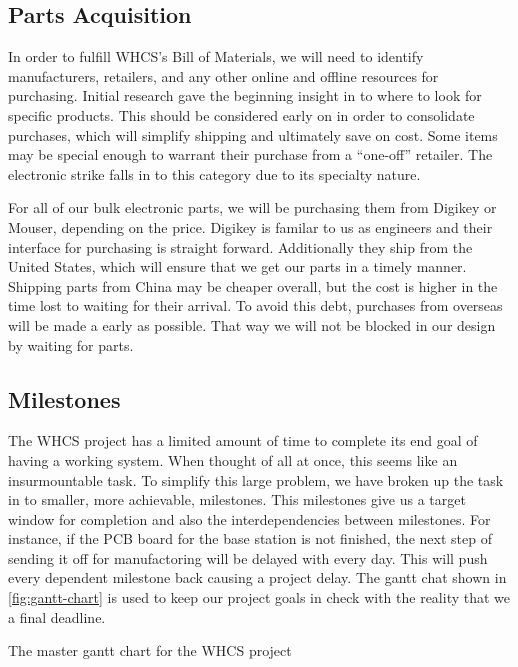 \subsection{Parts Acquisition}
In order to fulfill WHCS's Bill of Materials, we will need to identify
manufacturers, retailers, and any other online and offline resources for
purchasing. Initial research gave the beginning insight in to where to look for
specific products. This should be considered early on in order to consolidate
purchases, which will simplify shipping and ultimately save on cost. Some items
may be special enough to warrant their purchase from a ``one-off'' retailer.
The electronic strike falls in to this category due to its specialty nature.

For all of our bulk electronic parts, we will be purchasing them from Digikey
or Mouser, depending on the price. Digikey is familar to us as engineers and
their interface for purchasing is straight forward. Additionally they ship from
the United States, which will ensure that we get our parts in a timely manner.
Shipping parts from China may be cheaper overall, but the cost is higher in the
time lost to waiting for their arrival. To avoid this debt, purchases from
overseas will be made a early as possible. That way we will not be blocked in
our design by waiting for parts.

\subsection{Milestones}
The WHCS project has a limited amount of time to complete its end goal of
having a working system. When thought of all at once, this seems like an
insurmountable task. To simplify this large problem, we have broken up the task
in to smaller, more achievable, milestones. This milestones give us a target
window for completion and also the interdependencies between milestones. For
instance, if the PCB board for the base station is not finished, the next step
of sending it off for manufactoring will be delayed with every day. This will
push every dependent milestone back causing a project delay. The gantt chat
shown in \autoref{fig:gantt-chart} is used to keep our project goals in check
with the reality that we a final deadline.

{The master gantt chart for the WHCS project}
